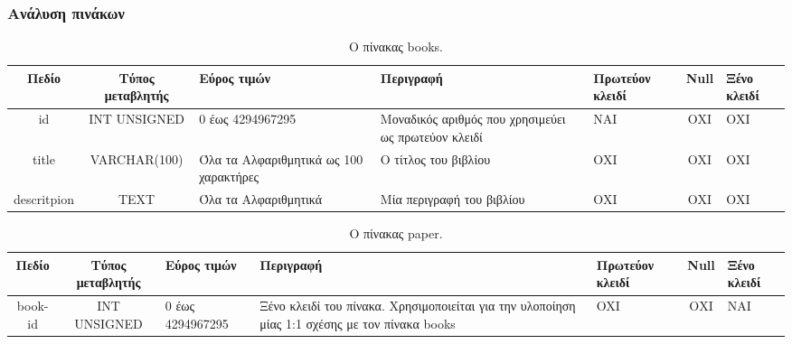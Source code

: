 \documentclass{assignment}
\begin{document}
\begin{landscape}
\subsubsection{Ανάλυση πινάκων}


\begin{table}[htbp]
\begin{center}
  \begin{tabular}{|c|c|m{}|m{}|m{2.0cm}|c|m{1.5cm}|}
    \hline
    {\bf Πεδίο} & {\bf Τύπος μεταβλητής} & {\bf Εύρος τιμών} & {\bf Περιγραφή} & {\bf Πρωτεύον κλειδί} & {\bf Null} & {\bf Ξένο κλειδί} \\ \hline
    id & INT UNSIGNED & 0 έως 4294967295 & Μοναδικός αριθμός που χρησιμεύει ως πρωτεύον κλειδί & ΝΑΙ & ΟΧΙ & ΟΧΙ \\ \hline
    title & VARCHAR(100) & Όλα τα Αλφαριθμητικά ως 100 χαρακτήρες & Ο τίτλος του βιβλίου & ΟΧΙ & ΟΧΙ & ΟΧΙ \\ \hline
    descritpion & TEXT & Όλα τα Αλφαριθμητικά & Μία περιγραφή του βιβλίου & ΟΧΙ & ΟΧΙ & ΟΧΙ \\ \hline
  \end{tabular}
\caption{Ο πίνακας books.}
\label{table:db_table:books}
\end{center}
\end{table}


\begin{table}[htbp]
\begin{center}
  \begin{tabular}{|c|c|m{}|m{}|m{2.0cm}|c|m{1.5cm}|}
    \hline
    {\bf Πεδίο} & {\bf Τύπος μεταβλητής} & {\bf Εύρος τιμών} & {\bf Περιγραφή} & {\bf Πρωτεύον κλειδί} & {\bf Null} & {\bf Ξένο κλειδί} \\ \hline
    book-id & INT UNSIGNED & 0 έως 4294967295 & Ξένο κλειδί του πίνακα. Χρησιμοποιείται για την υλοποίηση μίας 1:1 σχέσης με τον πίνακα books & OXI & ΟΧΙ & NAI \\ \hline
  \end{tabular}
\caption{Ο πίνακας paper.}
\label{table:db_table:paper}
\end{center}
\end{table}
\end{landscape}
\end{document}
